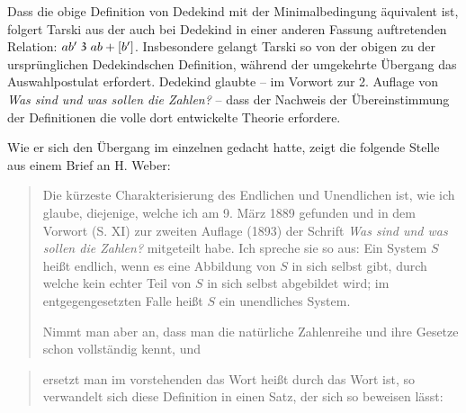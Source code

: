 \documentclass[leqno,hidelinks]{article}
\theoremstyle{definition}
\newcommand\TeilVon{\mathrel{\raisebox{0.45ex}{$\mathfrak{3}$}}}
\begin{document}
\begin{paracol}{2}
Dass die obige Definition von Dedekind mit der Minimalbedingung äquivalent ist,
folgert Tarski aus der auch bei Dedekind in einer anderen Fassung auftretenden
Relation: $ab' \TeilVon ab + [b']$. Insbesondere gelangt Tarski so von der obigen
zu der ursprünglichen Dedekindschen Definition, während der umgekehrte Übergang
das Auswahlpostulat erfordert. Dedekind glaubte -- im Vorwort zur 2. Auflage von
\textit{\glqq Was sind und was sollen die Zahlen?\grqq{}} -- dass der Nachweis
der Übereinstimmung der Definitionen die volle dort entwickelte Theorie erfordere.

Wie er sich den Übergang im einzelnen gedacht hatte, zeigt die folgende Stelle
aus einem Brief an H. Weber:
\begin{quote}
\glqq Die kürzeste Charakterisierung des Endlichen und Unendlichen ist, wie ich
glaube, diejenige, welche ich am 9. März 1889 gefunden und in dem Vorwort (S. XI)
zur zweiten Auflage (1893) der Schrift \textit{\glqq Was sind und was sollen die
Zahlen?\grqq{}} mitgeteilt habe. Ich spreche sie so aus: \glq Ein System $S$ heißt
endlich, wenn es eine Abbildung von $S$ in sich selbst gibt, durch welche kein
echter Teil von $S$ in sich selbst abgebildet wird; im entgegengesetzten Falle
heißt $S$ ein unendliches System\grq{}.

\hspace{12pt} Nimmt man aber an, dass man die natürliche Zahlenreihe und ihre
Gesetze schon vollständig kennt, und
\end{quote}

\newpage

\begin{quote}
ersetzt man im vorstehenden das Wort \glq heißt\grq{} durch das Wort \glq ist\grq{},
so verwandelt sich diese Definition in einen Satz, der sich so beweisen lässt:


\end{quote}
\end{paracol}
\end{document}
